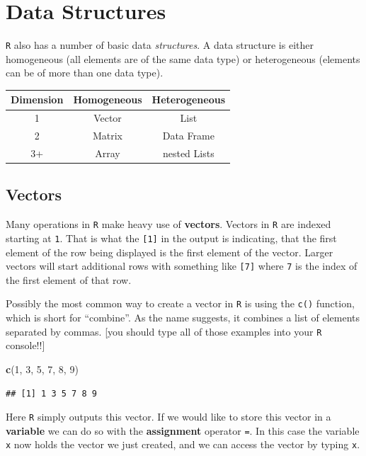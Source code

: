 \documentclass[]{book}
\newenvironment{Shaded}{\begin{snugshade}}{\end{snugshade}}
\newcommand{\KeywordTok}[1]{\textcolor[rgb]{0.13,0.29,0.53}{\textbf{#1}}}
\newcommand{\DecValTok}[1]{\textcolor[rgb]{0.00,0.00,0.81}{#1}}
\newcommand{\NormalTok}[1]{#1}
\theoremstyle{definition}
\theoremstyle{definition}
\theoremstyle{definition}
\theoremstyle{remark}
\begin{document}
\section{Data Structures}\label{data-structures}

\texttt{R} also has a number of basic data \emph{structures}. A data
structure is either homogeneous (all elements are of the same data type)
or heterogeneous (elements can be of more than one data type).

\begin{longtable}[]{@{}ccc@{}}
\toprule
Dimension & \textbf{Homogeneous} & \textbf{Heterogeneous}\tabularnewline
\midrule
\endhead
1 & Vector & List\tabularnewline
2 & Matrix & Data Frame\tabularnewline
3+ & Array & nested Lists\tabularnewline
\bottomrule
\end{longtable}

\subsection{Vectors}\label{vectors}

Many operations in \texttt{R} make heavy use of \textbf{vectors}.
Vectors in \texttt{R} are indexed starting at \texttt{1}. That is what
the \texttt{{[}1{]}} in the output is indicating, that the first element
of the row being displayed is the first element of the vector. Larger
vectors will start additional rows with something like \texttt{{[}7{]}}
where \texttt{7} is the index of the first element of that row.

Possibly the most common way to create a vector in \texttt{R} is using
the \texttt{c()} function, which is short for ``combine''. As the name
suggests, it combines a list of elements separated by commas. {[}you
should type all of those examples into your \texttt{R} console!!{]}

\begin{Shaded}
\begin{Highlighting}[]
\KeywordTok{c}\NormalTok{(}\DecValTok{1}\NormalTok{, }\DecValTok{3}\NormalTok{, }\DecValTok{5}\NormalTok{, }\DecValTok{7}\NormalTok{, }\DecValTok{8}\NormalTok{, }\DecValTok{9}\NormalTok{)}
\end{Highlighting}
\end{Shaded}

\begin{verbatim}
## [1] 1 3 5 7 8 9
\end{verbatim}

Here \texttt{R} simply outputs this vector. If we would like to store
this vector in a \textbf{variable} we can do so with the
\textbf{assignment} operator \texttt{=}. In this case the variable
\texttt{x} now holds the vector we just created, and we can access the
vector by typing \texttt{x}.
\end{document}
